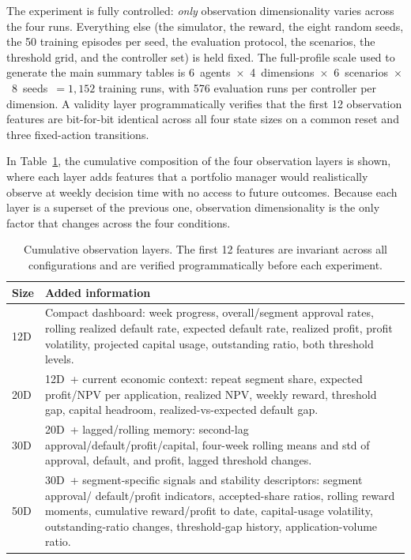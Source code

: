 \documentclass[preprint,review,authoryear,12pt]{elsarticle}
\begin{document}
The experiment is fully controlled: \emph{only} observation dimensionality varies across
the four runs. Everything else (the simulator, the reward, the eight random seeds, the
50 training episodes per seed, the evaluation protocol, the scenarios, the threshold
grid, and the controller set) is held fixed. The full-profile scale used to generate the
main summary tables is 6~agents~$\times$~4~dimensions~$\times$~6~scenarios~$\times$~8~seeds~$=
    1{,}152$ training runs, with 576 evaluation runs per controller per dimension. A validity
layer programmatically verifies that the first 12 observation features are bit-for-bit
identical across all four state sizes on a common reset and three fixed-action
transitions.

In Table~\ref{tab:state-layers}, the cumulative composition of the four observation
layers is shown, where each layer adds features that a portfolio manager would
realistically observe at weekly decision time with no access to future outcomes. Because
each layer is a superset of the previous one, observation dimensionality is the only
factor that changes across the four conditions.

\begin{table}[t]
    \centering
    \small
    \caption{Cumulative observation layers. The first 12 features are invariant across all
        configurations and are verified programmatically before each experiment.}
    \label{tab:state-layers}
    \begin{tabularx}{0.96\linewidth}{>{\centering\arraybackslash}p{}
            >{\raggedright\arraybackslash}X}
        \toprule
        Size & Added information                                                             \\
        \midrule
        12D  & Compact dashboard: week progress, overall/segment approval rates,
        rolling realized default rate, expected default rate, realized profit, profit
        volatility, projected capital usage, outstanding ratio, both threshold levels.       \\
        20D  & 12D~+ current economic context: repeat segment share, expected profit/NPV per
        application, realized NPV, weekly reward, threshold gap, capital headroom,
        realized-vs-expected default gap.                                                    \\
        30D  & 20D~+ lagged/rolling memory: second-lag approval/default/profit/capital,
        four-week rolling means and std of approval, default, and profit, lagged
        threshold changes.                                                                   \\
        50D  & 30D~+ segment-specific signals and stability descriptors: segment approval/
        default/profit indicators, accepted-share ratios, rolling reward moments,
        cumulative reward/profit to date, capital-usage volatility, outstanding-ratio
        changes, threshold-gap history, application-volume ratio.                            \\
        \bottomrule
    \end{tabularx}
\end{table}
\end{document}
